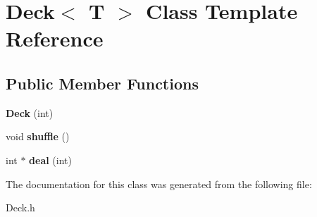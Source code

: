 \hypertarget{class_deck}{}\section{Deck$<$ T $>$ Class Template Reference}
\label{class_deck}
\subsection*{Public Member Functions}
\begin{DoxyCompactItemize}
\item 
\mbox{\label{class_deck_a6849ad13680ea66375e3d26100e17894}} 
{\bfseries Deck} (int)
\item 
\mbox{\label{class_deck_a64897016baf6e1c48f632dcc807096e7}} 
void {\bfseries shuffle} ()
\item 
\mbox{\label{class_deck_a5233df139a0b0ebf01e81fd0ab5e9f27}} 
int $\ast$ {\bfseries deal} (int)
\end{DoxyCompactItemize}


The documentation for this class was generated from the following file\+:\begin{DoxyCompactItemize}
\item 
Deck.\+h\end{DoxyCompactItemize}
